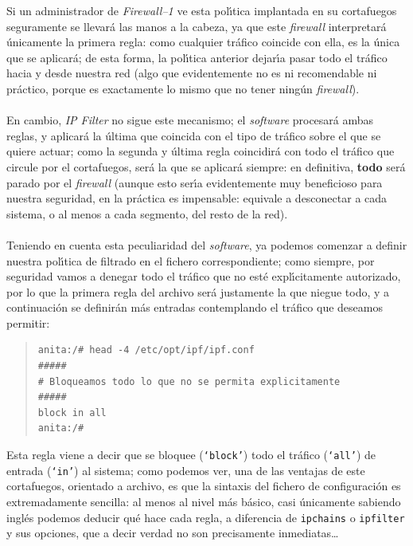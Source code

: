Si un administrador de {\it Firewall--1} ve esta pol\'{\i}tica implantada en
su cortafuegos seguramente se llevar\'a las manos a la cabeza, ya que este
{\it firewall} interpretar\'a \'unicamente la primera regla: como cualquier
tr\'afico coincide con ella, es la \'unica que se aplicar\'a; de esta forma, 
la pol\'{\i}tica anterior dejar\'{\i}a pasar todo el tr\'afico hacia y desde
nuestra red (algo que evidentemente no es ni recomendable ni pr\'actico, porque
es exactamente lo mismo que no tener ning\'un {\it firewall}).\\
\\En cambio, {\it IP Filter} no sigue este mecanismo; el {\it software} 
procesar\'a ambas reglas, y aplicar\'a la \'ultima que coincida con el tipo de
tr\'afico sobre el que se quiere actuar; como la segunda y \'ultima regla 
coincidir\'a con todo el tr\'afico que circule por el cortafuegos, ser\'a la que
se aplicar\'a siempre: en definitiva, {\bf todo} ser\'a parado por el {\it
firewall} (aunque esto ser\'{\i}a evidentemente muy beneficioso para nuestra
seguridad, en la pr\'actica es impensable: equivale a desconectar a cada 
sistema, o al menos a cada segmento, del resto de la red).\\
\\Teniendo en cuenta esta peculiaridad del {\it software}, ya podemos comenzar
a definir nuestra pol\'{\i}tica de filtrado en el fichero correspondiente; como
siempre, por seguridad vamos a denegar todo el tr\'afico que no est\'e 
expl\'{\i}citamente autorizado, por lo que la primera regla del archivo ser\'a
justamente la que niegue todo, y a continuaci\'on se definir\'an m\'as entradas 
contemplando el tr\'afico que deseamos permitir:
\begin{quote}
\begin{verbatim}
anita:/# head -4 /etc/opt/ipf/ipf.conf 
#####
# Bloqueamos todo lo que no se permita explicitamente
#####
block in all
anita:/# 
\end{verbatim}
\end{quote}
Esta regla viene a decir que se bloquee ({\tt `block'}) todo el tr\'afico 
({\tt `all'}) de entrada ({\tt `in'}) al sistema;
como podemos ver, una de las ventajas de este cortafuegos, orientado a archivo,
es que la sintaxis del fichero de configuraci\'on es extremadamente sencilla:
al menos al nivel m\'as b\'asico, casi \'unicamente sabiendo ingl\'es podemos
deducir qu\'e hace cada regla, a diferencia de {\tt ipchains} o {\tt ipfilter} 
y sus opciones, que a decir verdad no son precisamente inmediatas\ldots\\
